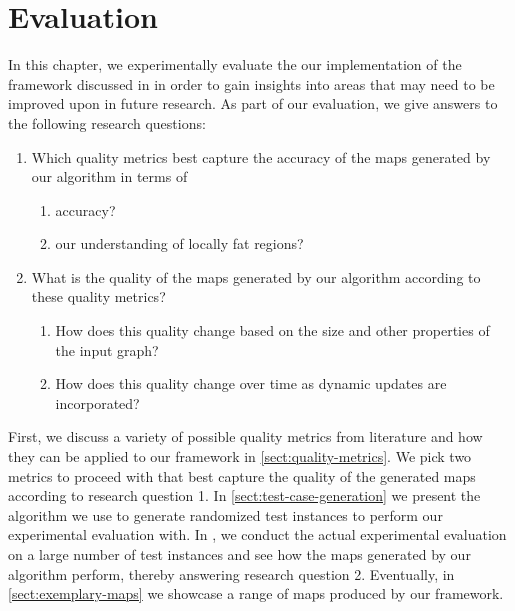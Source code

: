\chapter{Evaluation}
\label{chap:evaluation}

In this chapter, we experimentally evaluate the our implementation of the framework discussed in  in order to gain insights into areas that may need to be improved upon in future research.
As part of our evaluation, we give answers to the following research questions:

\begin{enumerate}
	\item Which quality metrics best capture the accuracy of the maps generated by our algorithm in terms of
	\begin{enumerate}
	\item accuracy?
	\item our understanding of locally fat regions?
	\end{enumerate}
	\item What is the quality of the maps generated by our algorithm according to these quality metrics?
	\begin{enumerate}
	\item How does this quality change based on the size and other properties of the input graph?
	\item How does this quality change over time as dynamic updates are incorporated?
	\end{enumerate}
\end{enumerate}

First, we discuss a variety of possible quality metrics from literature and how they can be applied to our framework in \cref{sect:quality-metrics}.
We pick two metrics to proceed with that best capture the quality of the generated maps according to research question 1.
In \cref{sect:test-case-generation} we present the algorithm we use to generate randomized test instances to perform our experimental evaluation with.
In , we conduct the actual experimental evaluation on a large number of test instances and see how the maps generated by our algorithm perform, thereby answering research question 2.
Eventually, in \cref{sect:exemplary-maps} we showcase a range of maps produced by our framework.


\clearpage

\clearpage

\clearpage

\clearpage


